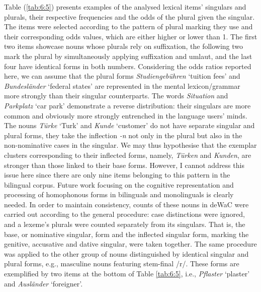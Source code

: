 Table (\ref{tab:6:5}) presents examples of the analysed lexical items’ singulars and plurals, their respective frequencies and the odds of the plural given the singular. The items were selected according to the pattern of plural marking they use and their corresponding odds values, which are either higher or lower than 1. The first two items showcase nouns whose plurals rely on suffixation, the following two mark the plural by simultaneously applying suffixation and umlaut, and the last four have identical forms in both numbers. Considering the odds ratios reported here, we can assume that the plural forms \textit{Studiengebühren} `tuition fees' and \textit{Bundesländer} `federal states' are represented in the mental lexicon/grammar more strongly than their singular counterparts. The words \textit{Situation} and \textit{Parkplatz} `car park' demonstrate a reverse distribution: their singulars are more common and obviously more strongly entrenched in the language users' minds. The nouns \textit{Türke} `Turk' and \textit{Kunde} `customer' do not have separate singular and plural forms, they take the inflection \textit{-n} not only in the plural but also in the non-nominative cases in the singular. We may thus hypothesise that the exemplar clusters corresponding to their inflected forms, namely, \textit{Türken} and \textit{Kunden}, are stronger than those linked to their base forms. However, I cannot address this issue here since there are only nine items belonging to this pattern in the bilingual corpus. Future work focusing on the cognitive representation and processing of homophonous forms in bilinguals and monolinguals is clearly needed. In order to maintain consistency, counts of these nouns in deWaC were carried out according to the general procedure: case distinctions were ignored, and a lexeme’s plurals were counted separately from its singulars. That is, the base, or nominative singular, form and the inflected singular form, marking the genitive, accusative and dative singular, were taken together. The same procedure was applied to the other group of nouns distinguished by identical singular and plural forms, e.g., masculine nouns featuring stem-final /r/. These forms are exemplified by two items at the bottom of Table \ref{tab:6:5}, i.e., \textit{Pflaster} `plaster' and \textit{Ausländer} `foreigner'.

